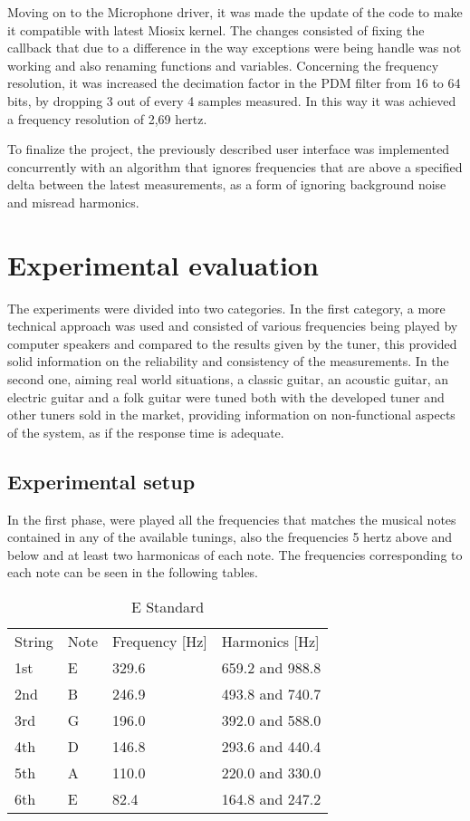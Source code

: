 Moving on to the Microphone driver, it was made the update of the code to make it compatible with latest Miosix kernel. The changes consisted of fixing the callback that due to a difference in the way exceptions were being handle was not working and also renaming functions and variables. Concerning the frequency resolution, it was increased the decimation factor in the PDM filter from 16 to 64 bits, by dropping 3 out of every 4 samples measured. In this way it was achieved a frequency resolution of 2,69 hertz. 

To finalize the project, the previously described user interface was implemented concurrently with an algorithm that ignores frequencies that are above a specified delta between the latest measurements, as a form of ignoring background noise and misread harmonics.


\section{Experimental evaluation}
The experiments were divided into two categories. In the first category, a more technical approach was used and consisted of various frequencies being played by computer speakers and compared to the results given by the tuner, this provided solid information on the reliability and consistency of the measurements. In the second one, aiming real world situations, a classic guitar, an acoustic guitar, an electric guitar and a folk guitar were tuned both with the developed tuner and other tuners sold in the market, providing information on non-functional aspects of the system, as if the response time is adequate. 
\subsection{Experimental setup}
In the first phase, were played all the frequencies that matches the musical notes contained in any of the available tunings, also the frequencies 5 hertz above and below and at least two harmonicas of each note. The frequencies corresponding to each note can be seen in the following tables.

\begin{table}[H]
\centering
\caption{E Standard}
\label{e_tuning}
\begin{tabular}{llll}
String & Note & Frequency [Hz] & Harmonics [Hz]       \\
1st     & E    & 329.6     & 659.2 and 988.8 \\
2nd    & B    & 246.9     & 493.8 and 740.7 \\
3rd     & G    & 196.0     & 392.0 and 588.0 \\
4th     & D    & 146.8     & 293.6 and 440.4 \\
5th     & A    & 110.0     & 220.0 and 330.0 \\
6th     & E    & 82.4      & 164.8 and 247.2
\end{tabular}
\end{table}


